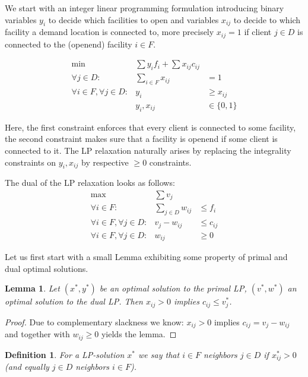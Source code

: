 \documentclass{article}
\newtheorem{definition}{Definition}
\newtheorem{lemma}{Lemma}
\begin{document}
We start with an integer linear programming formulation introducing binary variables $y_i$ to decide which facilities to open and variables $x_{ij}$ to decide to which facility a demand location is connected to, more precisely $x_{ij}=1$ if client $j\in D$ is connected to the (openend) facility $i\in F$.


\begin{eqnarray}\label{UFL}
\mbox{min} & \displaystyle \sum y_i f_i + \sum x_{ij}c_{ij}\\
 \forall j\in D: & \sum_{i\in F} x_{ij}  & = 1 \nonumber\\
 \forall i\in F, \forall j\in D: & y_i &\geq x_{ij} \nonumber\\
 & y_i, x_{ij}&\in \{0,1\} \nonumber
\end{eqnarray}

Here, the first constraint enforces that every client is connected to some facility, the second constraint makes sure that a facility is openend if some client is connected to it. The LP relaxation naturally arises by replacing the integrality constraints on $y_i, x_{ij}$ by respective $\geq 0$ constraints.

The dual of the LP relaxation looks as follows:
\begin{eqnarray}\label{UFLD}
\mbox{max} & \displaystyle \sum v_j \\
 \forall i\in F: & \sum_{j\in D} w_{ij}  & \leq f_i \nonumber\\
 \forall i\in F, \forall j\in D: & v_j - w_{ij} &\leq c_{ij} \nonumber\\
 \forall i\in F, \forall j\in D: & w_{ij}&\geq 0 \nonumber
\end{eqnarray}

Let us first start with a small Lemma exhibiting some property of primal and dual optimal solutions.

\begin{lemma}
Let $(x^*, y^*)$ be an optimal solution to the primal LP, $(v^*, w^*)$ an optimal solution to the dual LP. Then $x_{ij}>0$ implies $c_{ij}\leq v_j^*$.
\end{lemma}
\begin{proof}
Due to complementary slackness we know: $x_{ij}>0$ implies $c_{ij}=v_j-w_{ij}$ and together with $w_{ij}\geq 0$ yields the lemma.
\end{proof}

\begin{definition}
For a LP-solution $x^*$ we say that $i\in F$ \emph{neighbors} $j\in D$ if $x^*_{ij}>0$ (and equally $j\in D$ \emph{neighbors} $i\in F$).
\end{definition}
\end{document}
